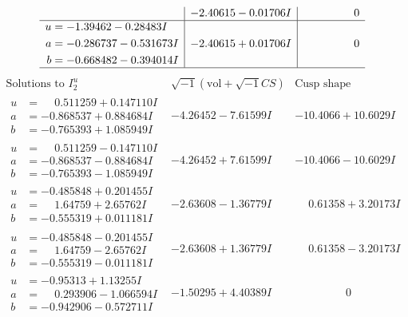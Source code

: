 \documentclass[1p]{elsarticle_modified}
\theoremstyle{definition}
\newcommand{\I}{\sqrt{-1}}
\begin{document}
$$\begin{array}{c|c|c}
 & -2.40615 - 0.01706 I & \phantom{-0.000000 } 0 \\ \hline\begin{aligned}
u &= -1.39462 - 0.28483 I \\
a &= -0.286737 - 0.531673 I \\
b &= -0.668482 - 0.394014 I\end{aligned}
 & -2.40615 + 0.01706 I & \phantom{-0.000000 } 0\\
 \hline 
 \end{array}$$\newpage$$\begin{array}{c|c|c}  
\text{Solutions to }I^u_{2}& \I (\text{vol} + \sqrt{-1}CS) & \text{Cusp shape}\\
 \hline 
\begin{aligned}
u &= \phantom{-}0.511259 + 0.147110 I \\
a &= -0.868537 + 0.884684 I \\
b &= -0.765393 + 1.085949 I\end{aligned}
 & -4.26452 - 7.61599 I & -10.4066 + 10.6029 I \\ \hline\begin{aligned}
u &= \phantom{-}0.511259 - 0.147110 I \\
a &= -0.868537 - 0.884684 I \\
b &= -0.765393 - 1.085949 I\end{aligned}
 & -4.26452 + 7.61599 I & -10.4066 - 10.6029 I \\ \hline\begin{aligned}
u &= -0.485848 + 0.201455 I \\
a &= \phantom{-}1.64759 + 2.65762 I \\
b &= -0.555319 + 0.011181 I\end{aligned}
 & -2.63608 - 1.36779 I & \phantom{-}0.61358 + 3.20173 I \\ \hline\begin{aligned}
u &= -0.485848 - 0.201455 I \\
a &= \phantom{-}1.64759 - 2.65762 I \\
b &= -0.555319 - 0.011181 I\end{aligned}
 & -2.63608 + 1.36779 I & \phantom{-}0.61358 - 3.20173 I \\ \hline\begin{aligned}
u &= -0.95313 + 1.13255 I \\
a &= \phantom{-}0.293906 - 1.066594 I \\
b &= -0.942906 - 0.572711 I\end{aligned}
 & -1.50295 + 4.40389 I & \phantom{-0.000000 } 0 \\ \hline\begin{aligned}

\end{aligned}
\end{array}$$
\end{document}
